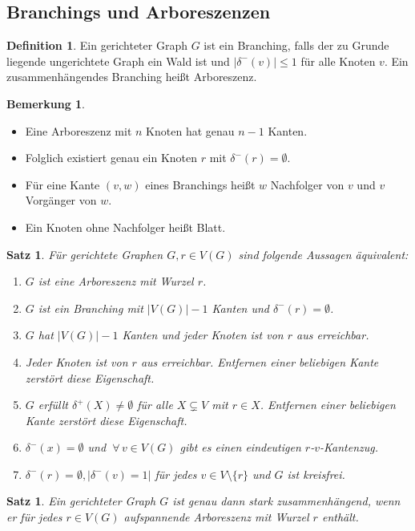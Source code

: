 \documentclass[a4paper,12pt]{article}
\newtheorem{satz}[axiom]{Satz}
\theoremstyle{definition}
\newtheorem*{bemerkung}{Bemerkung}
\newtheorem{definition}[axiom]{Definition}
\let\oldforall\forall
\renewcommand{\forall}{\:\oldforall \, }
\begin{document}
	\subsection{Branchings und Arboreszenzen}
	\begin{definition}
		Ein gerichteter Graph $G$ ist ein Branching, falls der zu Grunde liegende ungerichtete Graph ein Wald ist und $\lvert \delta^-(v)\rvert \leq 1$ für alle Knoten $v$. Ein zusammenhängendes Branching heißt Arboreszenz.
	\end{definition}
	\begin{bemerkung}
		\begin{itemize}
			\item Eine Arboreszenz mit $n$ Knoten hat genau $n-1$ Kanten.
			\item Folglich existiert genau ein Knoten $r$ mit $\delta^-(r) = \emptyset$.
			\item Für eine Kante $(v, w)$ eines Branchings heißt $w$ Nachfolger von $v$ und $v$ Vorgänger von $w$.
			\item Ein Knoten ohne Nachfolger heißt Blatt.
		\end{itemize}
	\end{bemerkung}
	\begin{satz}
		Für gerichtete Graphen $G, r \in V(G)$ sind folgende Aussagen äquivalent:
		\begin{enumerate}[label=(\roman*)]
			\item $G$ ist eine Arboreszenz mit Wurzel $r$.
			\item $G$ ist ein Branching mit $\lvert V(G)\rvert - 1$ Kanten und $\delta^-(r) = \emptyset$.
			\item $G$ hat $\lvert V(G)\rvert - 1$ Kanten und jeder Knoten ist von $r$ aus erreichbar.
			\item Jeder Knoten ist von $r$ aus erreichbar. Entfernen einer beliebigen Kante zerstört diese Eigenschaft.
			\item $G$ erfüllt $\delta^+(X) \neq \emptyset$ für alle $X \subsetneq V$ mit $r \in X$. Entfernen einer beliebigen Kante zerstört diese Eigenschaft.
			\item $\delta^-(x) = \emptyset$ und $\forall v \in V(G)$ gibt es einen eindeutigen $r$-$v$-Kantenzug.
			\item $\delta^-(r) = \emptyset, \lvert \delta^-(v) = 1\rvert$ für jedes $v \in V \setminus \{r\}$ und $G$ ist kreisfrei.
		\end{enumerate}
	\end{satz}
	\begin{satz}
		Ein gerichteter Graph $G$ ist genau dann stark zusammenhängend, wenn er für jedes $r \in V(G)$ aufspannende Arboreszenz mit Wurzel $r$ enthält.
	\end{satz}
\end{document}
